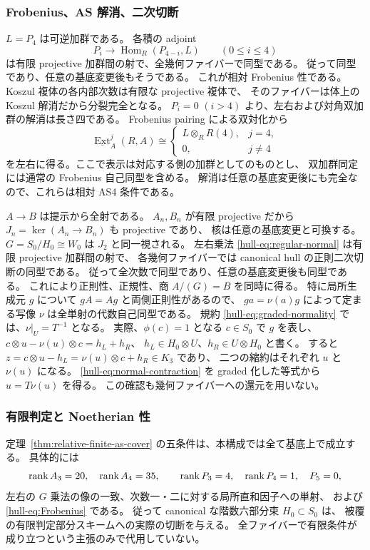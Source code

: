 \subsubsection{Frobenius、AS 解消、二次切断}

$L=P_4$ は可逆加群である。
各積の adjoint
\[
 P_i\longrightarrow\operatorname{Hom}_R(P_{4-i},L)
 \qquad(0\le i\le4)
 \tag{UH-18}\label{hull-eq:Frobenius}
\]
は有限 projective 加群間の射で、全幾何ファイバーで同型である。
従って同型であり、任意の基底変更後もそうである。
これが相対 Frobenius 性である。
Koszul 複体の各内部次数は有限な projective 複体で、
そのファイバーは体上の Koszul 解消だから分裂完全となる。
$P_i=0$ $(i>4)$ より、左右および対角双加群の解消は長さ四である。
Frobenius pairing による双対化から
\[
 \underline{\operatorname{Ext}}_A^j(R,A)
 \cong
 \begin{cases}
 L\otimes_RR(4),&j=4,\\
 0,&j\ne4
 \end{cases}
 \tag{UH-19}\label{hull-eq:AS}
\]
を左右に得る。ここで表示は対応する側の加群としてのものとし、
双加群同定には通常の Frobenius 自己同型を含める。
解消は任意の基底変更後にも完全なので、これらは相対 AS4 条件である。

$A\to B$ は提示から全射である。
$A_n,B_n$ が有限 projective だから $J_n=\ker(A_n\to B_n)$ も projective であり、
核は任意の基底変更と可換する。
$G=S_0/H_0\cong W_0$ は $J_2$ と同一視される。
左右乗法 \eqref{hull-eq:regular-normal} は有限 projective 加群間の射で、
各幾何ファイバーでは canonical hull の正則二次切断の同型である。
従って全次数で同型であり、任意の基底変更後も同型である。
これにより正則性、正規性、商 $A/(G)=B$ を同時に得る。
特に局所生成元 $g$ について $gA=Ag$ と両側正則性があるので、
$ga=\nu(a)g$ によって定まる写像 $\nu$ は全単射の代数自己同型である。
規約 \eqref{hull-eq:graded-normality} では、$\nu|_U=T^{-1}$ となる。
実際、$\phi(c)=1$ となる $c\in S_0$ で $g$ を表し、
$c\otimes u-\nu(u)\otimes c=h_L+h_R$、
$h_L\in H_0\otimes U$、$h_R\in U\otimes H_0$ と書く。
すると $z=c\otimes u-h_L=\nu(u)\otimes c+h_R\in K_3$ であり、
二つの縮約はそれぞれ $u$ と $\nu(u)$ になる。
\eqref{hull-eq:normal-contraction} を graded 化した等式から $u=T\nu(u)$ を得る。
この確認も幾何ファイバーへの還元を用いない。

\subsubsection{有限判定と Noetherian 性}

定理~\ref{thm:relative-finite-as-cover} の五条件は、本構成では全て基底上で成立する。
具体的には
\[
 \operatorname{rank} A_3=20,\quad\operatorname{rank} A_4=35,\qquad
 \operatorname{rank} P_3=4,\quad\operatorname{rank} P_4=1,\quad P_5=0,
\]
左右の $G$ 乗法の像の一致、次数一・二に対する局所直和因子への単射、
および \eqref{hull-eq:Frobenius} である。
従って canonical な階数六部分束 $H_0\subset S_0$ は、
被覆の有限判定部分スキームへの実際の切断を与える。
全ファイバーで有限条件が成り立つという主張のみで代用していない。

